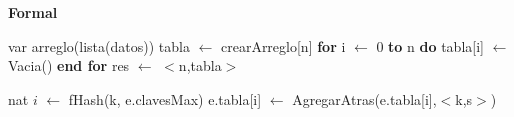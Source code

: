 \hspace*{\disSubSubSecMargen}\textbf{\textsf{Formal}}



\disFuncionDeAbstraccion
\vspace*{-1em}


\disFuncionDeAbsFuncionesAux


\newpage
\disAlgoritmos
\begin{algorithm}[H]
\begin{algorithmic}[1]
 
	\State var arreglo(lista(datos)) tabla $\gets$ crearArreglo[n] 
	\State \textbf{for} i $\gets$ 0 \textbf{to} n \textbf{do} 
  	\State tabla[i] $\gets$ Vacia() 
  	\State \textbf{end for}
  	\State res $\gets$ $<$n,tabla$>$ 
\EndFunction
\end{algorithmic}
\end{algorithm}

\begin{algorithm}[H]
\begin{algorithmic}[1]
 
    \State nat $i$ $\gets$ fHash(k, e.clavesMax) 
    \State e.tabla[i] $\gets$ AgregarAtras(e.tabla[i],$<$k,s$>$) 
\EndFunction
\end{algorithmic}
\end{algorithm}


